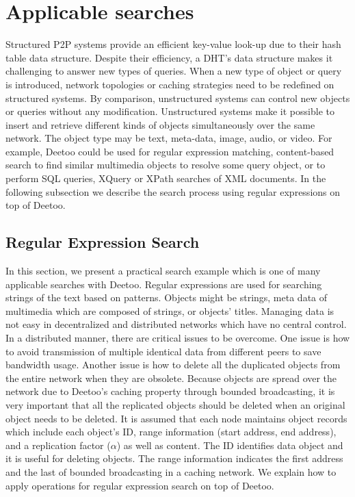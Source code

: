 \documentclass[9.5pt,journal,final,finalsubmission,twocolumn]{IEEEtran}
\begin{document}
\iffalse
\section{Applicable searches}
Structured P2P systems provide an efficient key-value look-up due to 
their hash table data structure.
Despite their efficiency, a DHT's data structure makes it challenging to answer new
types of queries.
When a new type of object or query is introduced, network topologies or 
caching strategies need to be redefined on structured systems. By comparison, 
unstructured systems can control new objects or queries without any modification. 
Unstructured systems make it possible to insert and retrieve 
different kinds of objects simultaneously over the same network.
The object type may be text, meta-data, image, audio, or video.
For example, Deetoo could be used for regular expression
matching, content-based search to find similar multimedia objects to
resolve some query object, or to perform SQL queries, XQuery or XPath searches of XML
documents. In the following subsection we describe the search process using 
regular expressions on top of Deetoo.
 
\subsection{Regular Expression Search}\label{sec:regex}
In this section, we present a practical search example which is one of many 
applicable searches with Deetoo.   
Regular expressions are used for searching strings of the text based on patterns. 
Objects might be strings, meta data of multimedia which are composed of strings, or 
objects' titles.
Managing data is not easy in decentralized and distributed 
networks which have no central control. In a distributed manner, there are critical issues 
to be overcome.
One issue is how to avoid transmission of multiple identical data 
from different peers to save bandwidth usage. 
Another issue is how to delete all the duplicated objects from the entire 
network when they are obsolete. 
Because objects are spread over the network due to Deetoo's caching property through  
bounded broadcasting, it is very important that all the replicated objects  
should be deleted when an original object needs to be deleted. 
It is assumed that each node maintains object records which include each object's ID, 
range information (start address, end address), and a replication factor ($\alpha$) as well as content.
The ID identifies data object and it is useful for deleting objects. 
The range information indicates the first address and the last 
of bounded broadcasting in a caching network. 
We explain how to apply operations for regular expression search on top of Deetoo.
\end{document}
